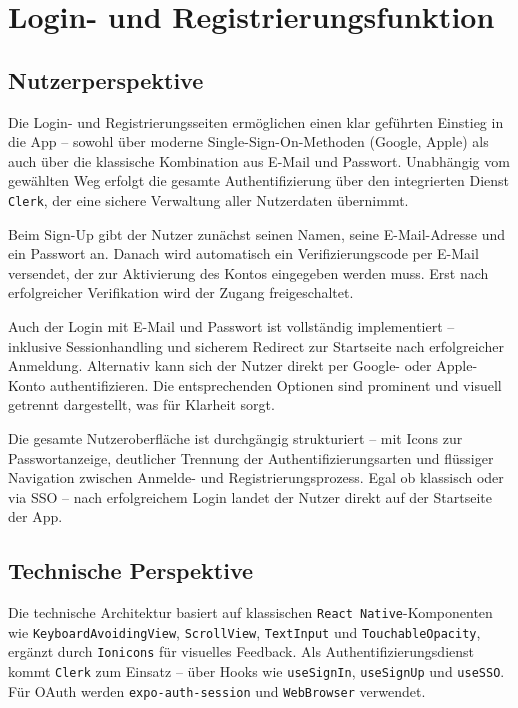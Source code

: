 \chapter{Login- und Registrierungsfunktion}
\renewcommand{\authorinitials}{FK}

\section{Nutzerperspektive}

Die Login- und Registrierungsseiten ermöglichen einen klar geführten Einstieg in die App – sowohl über moderne Single-Sign-On-Methoden (Google, Apple) als auch über die klassische Kombination aus E-Mail und Passwort. Unabhängig vom gewählten Weg erfolgt die gesamte Authentifizierung über den integrierten Dienst \texttt{Clerk}, der eine sichere Verwaltung aller Nutzerdaten übernimmt.

Beim Sign-Up gibt der Nutzer zunächst seinen Namen, seine E-Mail-Adresse und ein Passwort an. Danach wird automatisch ein Verifizierungscode per E-Mail versendet, der zur Aktivierung des Kontos eingegeben werden muss. Erst nach erfolgreicher Verifikation wird der Zugang freigeschaltet.

Auch der Login mit E-Mail und Passwort ist vollständig implementiert – inklusive Sessionhandling und sicherem Redirect zur Startseite nach erfolgreicher Anmeldung. Alternativ kann sich der Nutzer direkt per Google- oder Apple-Konto authentifizieren. Die entsprechenden Optionen sind prominent und visuell getrennt dargestellt, was für Klarheit sorgt.

Die gesamte Nutzeroberfläche ist durchgängig strukturiert – mit Icons zur Passwortanzeige, deutlicher Trennung der Authentifizierungsarten und flüssiger Navigation zwischen Anmelde- und Registrierungsprozess. Egal ob klassisch oder via SSO – nach erfolgreichem Login landet der Nutzer direkt auf der Startseite der App.

\section{Technische Perspektive}

Die technische Architektur basiert auf klassischen \texttt{React Native}-Komponenten wie \texttt{KeyboardAvoidingView}, \texttt{ScrollView}, \texttt{TextInput} und \texttt{TouchableOpacity}, ergänzt durch \texttt{Ionicons} für visuelles Feedback. Als Authentifizierungsdienst kommt \texttt{Clerk} zum Einsatz – über Hooks wie \texttt{useSignIn}, \texttt{useSignUp} und \texttt{useSSO}. Für OAuth werden \texttt{expo-auth-session} und \texttt{WebBrowser} verwendet.

